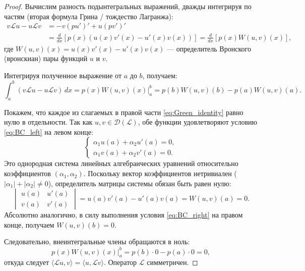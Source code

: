 \documentclass[12pt,a4paper]{article}
\begin{document}
\begin{proof}
Вычислим разность подынтегральных выражений, дважды интегрируя по частям (вторая формула Грина / тождество Лагранжа):
\begin{align}
    v \mathcal{L}u - u \mathcal{L}v &= -v (p u')' + u (p v')' \nonumber \\
    &= \frac{d}{dx}\left[ p(x) \left( u(x)v'(x) - u'(x)v(x) \right) \right] = \frac{d}{dx}\left[ p(x) W(u, v)(x) \right],
\end{align}
где $W(u, v)(x) = u(x)v'(x) - u'(x)v(x)$ — определитель Вронского (вронскиан) пары функций $u$ и $v$.

Интегрируя полученное выражение от $a$ до $b$, получаем:
\begin{equation}
    \int_a^b (v \mathcal{L}u - u \mathcal{L}v)\,dx = \left. p(x) W(u, v)(x) \right|_a^b = p(b)W(u, v)(b) - p(a)W(u, v)(a).
    \label{eq:Green_identity}
\end{equation}

Покажем, что каждое из слагаемых в правой части \eqref{eq:Green_identity} равно нулю в отдельности. 
Так как $u, v \in \mathcal{D}(\mathcal{L})$, обе функции удовлетворяют условию \eqref{eq:BC_left} на левом конце:
\begin{equation}
    \begin{cases}
        \alpha_1 u(a) + \alpha_2 u'(a) = 0, \\
        \alpha_1 v(a) + \alpha_2 v'(a) = 0.
    \end{cases}
\end{equation}
Это однородная система линейных алгебраических уравнений относительно коэффициентов $(\alpha_1, \alpha_2)$. Поскольку вектор коэффициентов нетривиален ($|\alpha_1| + |\alpha_2| \neq 0$), определитель матрицы системы обязан быть равен нулю:
\begin{equation}
    \begin{vmatrix} u(a) & u'(a) \\ v(a) & v'(a) \end{vmatrix} = u(a)v'(a) - u'(a)v(a) = W(u, v)(a) = 0.
\end{equation}
Абсолютно аналогично, в силу выполнения условия \eqref{eq:BC_right} на правом конце, получаем $W(u, v)(b) = 0$.

Следовательно, внеинтегральные члены обращаются в ноль:
\begin{equation}
    \left. p(x) W(u, v)(x) \right|_a^b = p(b) \cdot 0 - p(a) \cdot 0 = 0,
\end{equation}
откуда следует $\langle \mathcal{L}u, v \rangle = \langle u, \mathcal{L}v \rangle$. Оператор $\mathcal{L}$ симметричен.
\end{proof}
\end{document}
